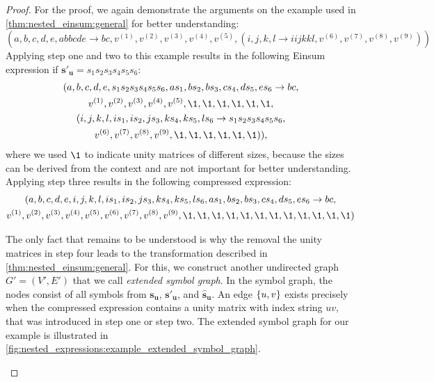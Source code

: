 \begin{proof}
    \small
    For the proof, we again demonstrate the arguments on the example used in \cref{thm:nested_einsum:general} for better understanding:
    $$(a,b,c,d,e,abbcde \rightarrow bc,v^{(1)}, v^{(2)}, v^{(3)}, v^{(4)}, v^{(5)}, (
        i,j,k,l \rightarrow iijkkl, v^{(6)}, v^{(7)}, v^{(8)}, v^{(9)}
        ))$$
    Applying step one and two to this example results in the following Einsum expression if $\bm{s'_u} = s_1 s_2 s_3 s_4 s_5 s_6$:
    \begin{gather*}
        (a,b,c,d,e,s_1 s_2 s_3 s_4 s_5 s_6, a s_1, b s_2, b s_3, c s_4, d s_5, e s_6 \rightarrow bc,\\
        v^{(1)}, v^{(2)}, v^{(3)}, v^{(4)}, v^{(5)}, \1, \1, \1, \1, \1, \1,\\
        (i,j,k,l, i s_1, i s_2, j s_3, k s_4, k s_5, l s_6 \rightarrow s_1 s_2 s_3 s_4 s_5 s_6,\\
        v^{(6)}, v^{(7)}, v^{(8)}, v^{(9)}, \1, \1, \1, \1, \1, \1)),
    \end{gather*}
    where we used $\1$ to indicate unity matrices of different sizes, because the sizes can be derived from the context and are not important for better understanding.
    Applying step three results in the following compressed expression:
    \begin{gather*}
        (a,b,c,d,e,i,j,k,l, i s_1, i s_2, j s_3, k s_4, k s_5, l s_6, a s_1, b s_2, b s_3, c s_4, d s_5, e s_6 \rightarrow bc,\\
        v^{(1)}, v^{(2)}, v^{(3)}, v^{(4)}, v^{(5)}, v^{(6)}, v^{(7)}, v^{(8)}, v^{(9)}, \1, \1, \1, \1, \1, \1, \1, \1, \1, \1, \1, \1)
    \end{gather*}

    The only fact that remains to be understood is why the removal the unity matrices in step four leads to the transformation described in \cref{thm:nested_einsum:general}.
    For this, we construct another undirected graph $G' = (V', E')$ that we call \textit{extended symbol graph}.
    In the symbol graph, the nodes consist of all symbols from $\bm{s_u}$, $\bm{s'_u}$, and $\bm{\hat{s}_u}$.
    An edge $\smallset{u,v}$ exists precisely when the compressed expression contains a unity matrix with index string $uv$, that was introduced in step one or step two.
    The extended symbol graph for our example is illustrated in \cref{fig:nested_expressions:example_extended_symbol_graph}.

    \begin{figure}[h]
        \centering
        \begin{tikzpicture}[node distance = 3cm, semithick]


\end{tikzpicture}
\end{figure}
\end{proof}
